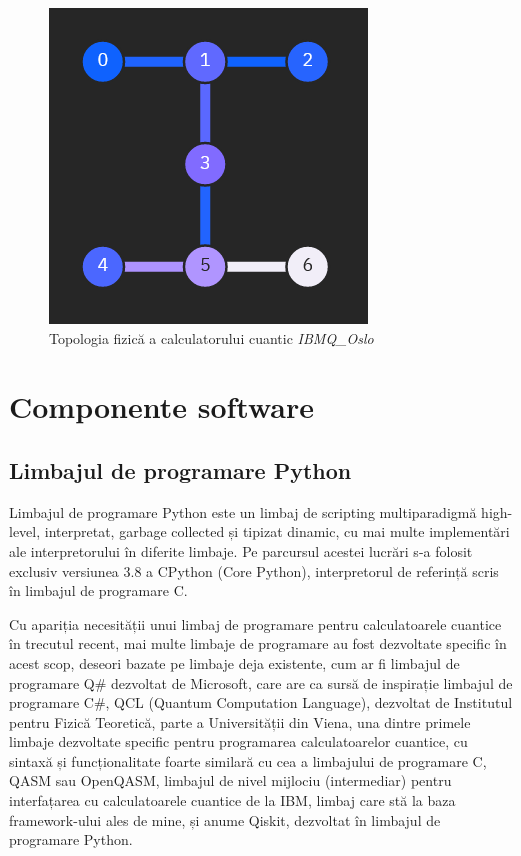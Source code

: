 \begin{figure}[H]
    \centering
    \includegraphics{anexe/figuri/TopologieOslo.png}
    \caption{Topologia fizică a calculatorului cuantic \textit{IBMQ\_Oslo} }
    \label{fig:TopologieOslo}
\end{figure}

\section{Componente software}

\subsection{Limbajul de programare Python}

Limbajul de programare Python este un limbaj de scripting multiparadigmă high-level, interpretat, garbage collected și tipizat dinamic, cu mai multe implementări ale interpretorului în diferite limbaje. Pe parcursul acestei lucrări s-a folosit exclusiv versiunea 3.8 a CPython (Core Python), interpretorul de referință scris în limbajul de programare C. 

Cu apariția necesității unui limbaj de programare pentru calculatoarele cuantice în trecutul recent, mai multe limbaje de programare au fost dezvoltate specific în acest scop, deseori bazate pe limbaje deja existente, cum ar fi limbajul de programare Q\# dezvoltat de Microsoft, care are ca sursă de inspirație limbajul de programare C\#, QCL (Quantum Computation Language), dezvoltat de Institutul pentru Fizică Teoretică, parte a Universității din Viena, una dintre primele limbaje dezvoltate specific pentru programarea calculatoarelor cuantice, cu sintaxă și funcționalitate foarte similară cu cea a limbajului de programare C, QASM sau OpenQASM, limbajul de nivel mijlociu (intermediar) pentru interfațarea cu calculatoarele cuantice de la IBM, limbaj care stă la baza framework-ului ales de mine, și anume Qiskit, dezvoltat în limbajul de programare Python.

